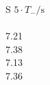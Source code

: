 \begin{minipage}{0.49\textwidth}
 \centering
 \begin{tabular}{S }
 \toprule
${5} \cdot T_{-} / \si{\second}$ \\
 \\
 7.21 \\
 7.38 \\
 7.13 \\
 7.36 \\
 \bottomrule
 \end{tabular}
 \label{tab:T_gegensinnig_60}
  \end{minipage}
